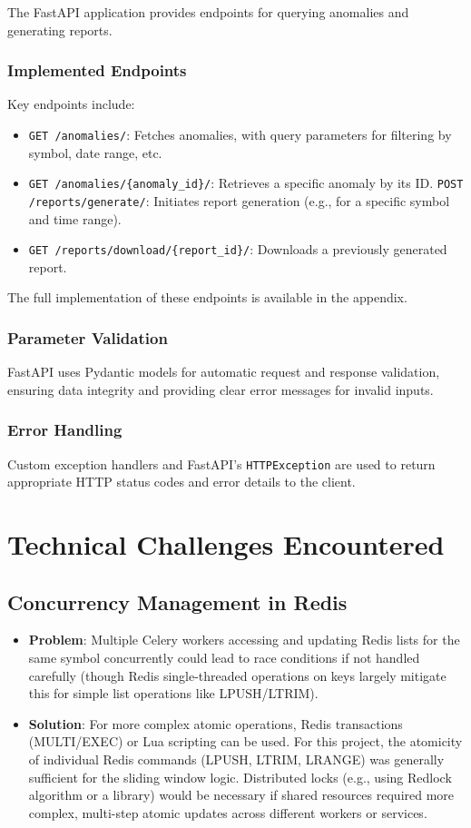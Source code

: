 The FastAPI application provides endpoints for querying anomalies and generating reports.

\subsubsection{Implemented Endpoints}
Key endpoints include:
\begin{itemize}
    \item \texttt{GET /anomalies/}: Fetches anomalies, with query parameters for filtering by symbol, date range, etc.
    \item \texttt{GET /anomalies/\{anomaly\_id\}/}: Retrieves a specific anomaly by its ID.
    \texttt{POST /reports/generate/}: Initiates report generation (e.g., for a specific symbol and time range).
    \item \texttt{GET /reports/download/\{report\_id\}/}: Downloads a previously generated report.
\end{itemize}
The full implementation of these endpoints is available in the appendix.

\subsubsection{Parameter Validation}
FastAPI uses Pydantic models for automatic request and response validation, ensuring data integrity and providing clear error messages for invalid inputs.

\subsubsection{Error Handling}
Custom exception handlers and FastAPI's \texttt{HTTPException} are used to return appropriate HTTP status codes and error details to the client.

\section{Technical Challenges Encountered}

\subsection{Concurrency Management in Redis}
\begin{itemize}
    \item \textbf{Problem}: Multiple Celery workers accessing and updating Redis lists for the same symbol concurrently could lead to race conditions if not handled carefully (though Redis single-threaded operations on keys largely mitigate this for simple list operations like LPUSH/LTRIM).
    \item \textbf{Solution}: For more complex atomic operations, Redis transactions (MULTI/EXEC) or Lua scripting can be used. For this project, the atomicity of individual Redis commands (LPUSH, LTRIM, LRANGE) was generally sufficient for the sliding window logic. Distributed locks (e.g., using Redlock algorithm or a library) would be necessary if shared resources required more complex, multi-step atomic updates across different workers or services.
\end{itemize}

